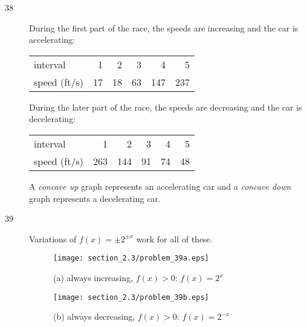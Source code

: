 \documentclass{exam}
\begin{document}
\ifprintanswers
  \begin{description}
    \item[38]
      During the first part of the race, the speeds are increasing and the car
      is accelerating:

        \begin{tabular}{lrrrrr}
          \toprule
          interval     &  1 &  2 &  3 &   4 &   5 \\ 
          speed (ft/s) & 17 & 18 & 63 & 147 & 237 \\
          \bottomrule
        \end{tabular}

      During the later part of the race, the speeds are decreasing and the car
      is decelerating:

        \begin{tabular}{lrrrrr}
          \toprule
          interval     &   1 &   2 &  3 &  4 &  5 \\ 
          speed (ft/s) & 263 & 144 & 91 & 74 & 48 \\
          \bottomrule
        \end{tabular}

      A {\em concave up} graph represents an accelerating car and a {\em concave
      down} graph represents a decelerating car.

    \item[39]
      Variations of $f(x) = \pm 2^{\pm x}$ work for all of these.  
     

      \begin{figure}[H]
        \centering
        \texttt{[image: section\_2.3/problem\_39a.eps]}
        \caption*{(a) always increasing, $f(x) > 0$: $f(x) = 2^x$}
      \end{figure}

      \begin{figure}[H]
        \centering
        \texttt{[image: section\_2.3/problem\_39b.eps]}
        \caption*{(b) always decreasing, $f(x) > 0$: $f(x) = 2^{-x}$}
      \end{figure}


\end{description}
\end{document}

